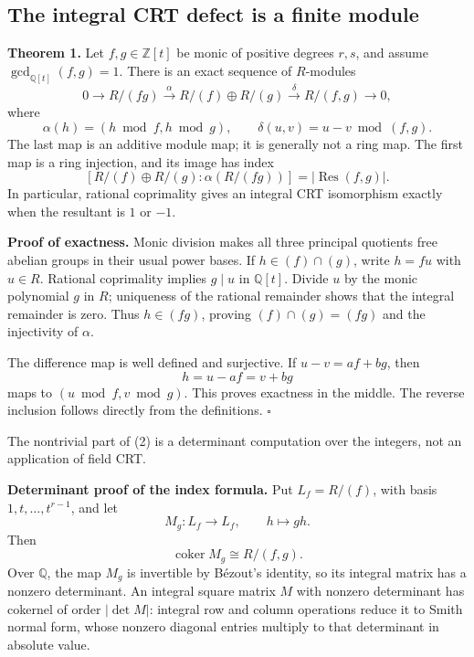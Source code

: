 \documentclass[
  11pt,
]{article}
\begin{document}
\subsection{The integral CRT defect is a finite
module}\label{the-integral-crt-defect-is-a-finite-module}

\textbf{Theorem 1.} Let \(f,g\in\mathbb Z[t]\) be monic of positive
degrees \(r,s\), and assume \(\gcd_{\mathbb Q[t]}(f,g)=1\). There is an
exact sequence of \(R\)-modules \[
 0\longrightarrow R/(fg)
 \xrightarrow{\alpha}R/(f)\oplus R/(g)
 \xrightarrow{\delta}R/(f,g)\longrightarrow0,                 \tag{1}
\] where \[
 \alpha(h)=(h\bmod f,h\bmod g),\qquad
 \delta(u,v)=u-v\bmod(f,g).
\] The last map is an additive module map; it is generally not a ring
map. The first map is a ring injection, and its image has index \[
 [R/(f)\oplus R/(g):\alpha(R/(fg))]
       =|\operatorname{Res}(f,g)|.                           \tag{2}
\] In particular, rational coprimality gives an integral CRT isomorphism
exactly when the resultant is \(1\) or \(-1\).

\textbf{Proof of exactness.} Monic division makes all three principal
quotients free abelian groups in their usual power bases. If
\(h\in(f)\cap(g)\), write \(h=fu\) with \(u\in R\). Rational coprimality
implies \(g\mid u\) in \(\mathbb Q[t]\). Divide \(u\) by the monic
polynomial \(g\) in \(R\); uniqueness of the rational remainder shows
that the integral remainder is zero. Thus \(h\in(fg)\), proving
\((f)\cap(g)=(fg)\) and the injectivity of \(\alpha\).

The difference map is well defined and surjective. If \(u-v=af+bg\),
then \[
 h=u-af=v+bg
\] maps to \((u\bmod f,v\bmod g)\). This proves exactness in the middle.
The reverse inclusion follows directly from the definitions. \(\square\)

The nontrivial part of (2) is a determinant computation over the
integers, not an application of field CRT.

\textbf{Determinant proof of the index formula.} Put \(L_f=R/(f)\), with
basis \(1,t,\ldots,t^{r-1}\), and let \[
 M_g:L_f\longrightarrow L_f,\qquad h\longmapsto gh.
\] Then \[
 \operatorname{coker}M_g\cong R/(f,g).                       \tag{3}
\] Over \(\mathbb Q\), the map \(M_g\) is invertible by Bézout's
identity, so its integral matrix has a nonzero determinant. An integral
square matrix \(M\) with nonzero determinant has cokernel of order
\(|\det M|\): integral row and column operations reduce it to Smith
normal form, whose nonzero diagonal entries multiply to that determinant
in absolute value.
\end{document}
